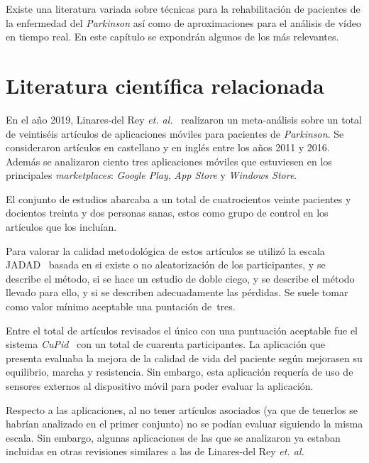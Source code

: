 
Existe una literatura variada sobre técnicas para la rehabilitación de pacientes de la enfermedad del \textit{Parkinson} así como de aproximaciones para el análisis de vídeo en tiempo real. En este capítulo se expondrán algunos de los más relevantes.

\section{Literatura científica relacionada}

En el año 2019, Linares-del Rey \textit{et. al.}~\cite{linares2019aplicaciones} realizaron un meta-análisis sobre un total de veintiséis artículos de aplicaciones móviles para pacientes de \textit{Parkinson}. Se consideraron artículos en castellano y en inglés entre los años 2011 y 2016. Además se analizaron ciento tres aplicaciones móviles que estuviesen en los principales \textit{marketplaces}: \textit{Google Play}, \textit{App Store} y \textit{Windows Store}.

El conjunto de estudios abarcaba a un total de cuatrocientos veinte pacientes y docientos treinta y dos personas sanas, estos como grupo de control en los artículos que los incluían. 

Para valorar la calidad metodológica de estos artículos se utilizó la escala JADAD~\cite{jadad1996assessing} basada en si existe o no aleatorización de los participantes, y se describe el método, si se hace un estudio de doble ciego, y se describe el método llevado para ello, y si se describen adecuadamente las pérdidas. Se suele tomar como valor mínimo aceptable una puntación de~tres.

Entre el total de artículos revisados el único con una puntuación aceptable fue el sistema \textit{CuPid}~\cite{ginis2016feasibility} con un total de cuarenta participantes. La aplicación que presenta evaluaba la mejora de la calidad de vida del paciente según mejorasen su equilibrio, marcha y resistencia. Sin embargo, esta aplicación requería de uso de sensores externos al dispositivo móvil para poder evaluar la aplicación.

Respecto a las aplicaciones, al no tener artículos asociados (ya que de tenerlos se habrían analizado en el primer conjunto) no se podían evaluar siguiendo la misma escala. Sin embargo, algunas aplicaciones de las que se analizaron ya estaban incluidas en otras revisiones similares a las de Linares-del Rey \textit{et. al.}

